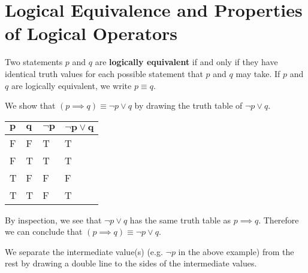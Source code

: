 \section{Logical Equivalence and Properties of Logical Operators}
\begin{definition}
    Two statements $p$ and $q$ are \textbf{logically equivalent} if and only if they have identical truth values for each possible statement that $p$ and $q$ may take. If $p$ and $q$ are logically equivalent, we write $p \equiv q$.
\end{definition}
\begin{example}\label{example-implication-law}
    We show that $(p \implies q) \equiv \lnot p \lor q$ by drawing the truth table of $\lnot p \lor q$.
    \begin{table}[H]
        \centering
        \begin{tabular}{|l|l||l||l|}
            \hline
            $\boldsymbol{p}$ & $\boldsymbol{q}$ & $\boldsymbol{\lnot p}$ & $\boldsymbol{\lnot p \lor q}$ \\ \hline
            F   & F   & T         & T                  \\ \hline
            F   & T   & T         & T                  \\ \hline
            T   & F   & F         & F                  \\ \hline
            T   & T   & F         & T                  \\ \hline
        \end{tabular}
    \end{table}

    By inspection, we see that $\lnot p \lor q$ has the same truth table as $p \implies q$. Therefore we can conclude that $(p \implies q) \equiv \lnot p \lor q$.
\end{example}
\begin{remark}
    We separate the intermediate value(s) (e.g. $\lnot p$ in the above example) from the rest by drawing a double line to the sides of the intermediate values.
\end{remark}

